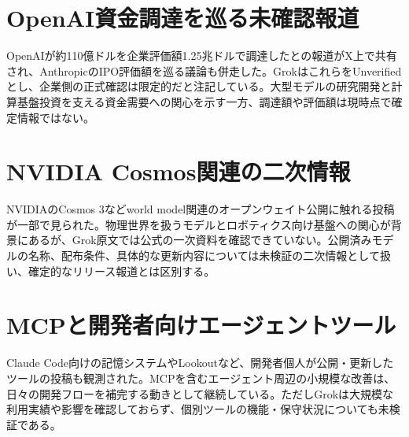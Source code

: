 \section{OpenAI資金調達を巡る未確認報道}
OpenAIが約110億ドルを企業評価額1.25兆ドルで調達したとの報道がX上で共有され、AnthropicのIPO評価額を巡る議論も併走した。GrokはこれらをUnverifiedとし、企業側の正式確認は限定的だと注記している。大型モデルの研究開発と計算基盤投資を支える資金需要への関心を示す一方、調達額や評価額は現時点で確定情報ではない。

\section{NVIDIA Cosmos関連の二次情報}
NVIDIAのCosmos 3などworld model関連のオープンウェイト公開に触れる投稿が一部で見られた。物理世界を扱うモデルとロボティクス向け基盤への関心が背景にあるが、Grok原文では公式の一次資料を確認できていない。公開済みモデルの名称、配布条件、具体的な更新内容については未検証の二次情報として扱い、確定的なリリース報道とは区別する。

\section{MCPと開発者向けエージェントツール}
Claude Code向けの記憶システムやLookoutなど、開発者個人が公開・更新したツールの投稿も観測された。MCPを含むエージェント周辺の小規模な改善は、日々の開発フローを補完する動きとして継続している。ただしGrokは大規模な利用実績や影響を確認しておらず、個別ツールの機能・保守状況についても未検証である。
